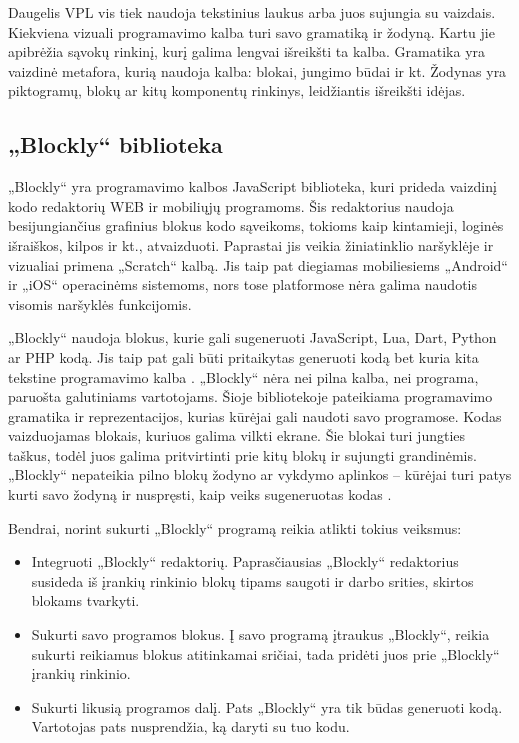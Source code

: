 \documentclass{VUMIFPSkursinis}
\begin{document}
Daugelis VPL vis tiek naudoja tekstinius laukus arba juos sujungia su vaizdais. Kiekviena vizuali programavimo kalba turi savo gramatiką ir žodyną. Kartu jie apibrėžia sąvokų rinkinį, kurį galima lengvai išreikšti ta kalba. Gramatika yra vaizdinė metafora, kurią naudoja kalba: blokai, jungimo būdai ir kt. Žodynas yra piktogramų, blokų ar kitų komponentų rinkinys, leidžiantis išreikšti idėjas. \cite{pasternak2017tips}

\subsection{„Blockly“ biblioteka}

„Blockly“ yra programavimo kalbos JavaScript biblioteka, kuri prideda vaizdinį kodo redaktorių WEB ir mobiliųjų programoms. Šis redaktorius naudoja besijungiančius grafinius blokus kodo sąveikoms, tokioms kaip kintamieji, loginės išraiškos, kilpos ir kt., atvaizduoti. \cite{introduction to blockly} Paprastai jis veikia žiniatinklio naršyklėje ir vizualiai primena „Scratch“ kalbą. Jis taip pat diegiamas mobiliesiems „Android“ ir „iOS“ operacinėms sistemoms, nors tose platformose nėra galima naudotis visomis naršyklės funkcijomis.

„Blockly“ naudoja blokus, kurie gali sugeneruoti JavaScript, Lua, Dart, Python ar PHP kodą. Jis taip pat gali būti pritaikytas generuoti kodą bet kuria kita tekstine programavimo kalba \cite{NBCBayArea}. „Blockly“ nėra nei pilna kalba, nei programa, paruošta galutiniams vartotojams. Šioje bibliotekoje pateikiama programavimo gramatika ir reprezentacijos, kurias kūrėjai gali naudoti savo programose. Kodas vaizduojamas blokais, kuriuos galima vilkti ekrane. Šie blokai turi jungties taškus, todėl juos galima pritvirtinti prie kitų blokų ir sujungti grandinėmis. „Blockly“ nepateikia pilno blokų žodyno ar vykdymo aplinkos -- kūrėjai turi patys kurti savo žodyną ir nuspręsti, kaip veiks sugeneruotas kodas  \cite{pasternak2017tips}.

Bendrai, norint sukurti „Blockly“ programą reikia atlikti tokius veiksmus:
\begin{itemize}
    \item Integruoti „Blockly“ redaktorių. Paprasčiausias „Blockly“ redaktorius susideda iš įrankių rinkinio blokų tipams saugoti ir darbo srities, skirtos blokams tvarkyti.
    \item Sukurti savo programos blokus. Į savo programą įtraukus „Blockly“, reikia sukurti reikiamus blokus atitinkamai sričiai, tada pridėti juos prie „Blockly“ įrankių rinkinio.
    \item Sukurti likusią programos dalį. Pats „Blockly“ yra tik būdas generuoti kodą. Vartotojas pats nusprendžia, ką daryti su tuo kodu.
\end{itemize}
\end{document}
